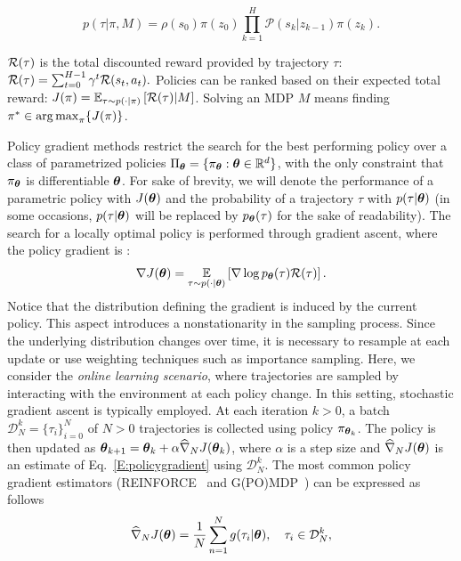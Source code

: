 \[
p(\tau|\pi,M) = \rho(s_0) \pi(z_0) \prod_{k=1}^{H} \mathcal{P}(s_k|z_{k-1})\pi(z_k).
\]

$\Reward(\tau)$ is the total discounted reward provided by trajectory $\tau$:
%
$\Reward(\tau) = \sum_{t=0}^{H-1}\gamma^t\Reward(s_t,a_t).$
%
Policies can be ranked based on their expected total reward: $J(\pi) = \EVV[\tau \sim p(\cdot|\pi)]{\Reward(\tau)|M}$.
Solving an \acs{MDP} $M$ means finding $\pi^* \in \argmax_{\pi} \{J(\pi)\}$.

Policy gradient methods restrict the search for the best performing policy over a class of parametrized policies $\Pi_{\vtheta}=\{\pol: \vtheta \in \realspace^d\}$, with the only constraint that $\pol$ is differentiable \wrt $\vtheta$. For sake of brevity, we will denote the performance of a parametric policy with $J(\vtheta)$ and the probability of a trajectory $\tau$ with $p(\tau|\vtheta)$ (in some occasions, $p(\tau|\vtheta)$ will be replaced by $p_{\vtheta}(\tau)$ for the sake of readability).
The search for a locally optimal policy is performed through gradient ascent, where the policy gradient
is \citep{sutton2000policy, Peters2008reinf}:
\begin{align} \label{E:policygradient}
	\gradJ{\vtheta} = \EVV[\tau \sim p(\cdot|\vtheta)]{\score{\vtheta}{\tau}\Reward(\tau)}.
\end{align}
Notice that the distribution defining the gradient is induced by the current policy. This aspect introduces a nonstationarity in the sampling process. Since the underlying distribution changes over time, it is necessary to resample at each update or use weighting techniques such as importance sampling.
Here, we consider the \emph{online learning scenario}, where trajectories are sampled by interacting with the environment at each policy change. 
In this setting, stochastic gradient ascent is typically employed.
At each iteration $k >0$, a batch $\mathcal{D}_N^k = \{\tau_i\}_{i=0}^N$ of $N>0$ trajectories is collected using policy $\pi_{\vtheta_k}$.
The policy is then updated as $\vtheta_{k+1}  = \vtheta_k + \alpha\gradApp{\vtheta_k}{N}$, where $\alpha$ is a step size and $\gradApp{\vtheta}{N}$ is an estimate of Eq.~\eqref{E:policygradient} using $\mathcal{D}_N^k$. The most common policy gradient estimators (\eg REINFORCE~\citep{williams1992simple} and G(PO)MDP~\citep{baxter2001infinite}) can be expressed as follows
\begin{align} \label{E:policygradient.estimate}
	\gradApp{\vtheta}{N} = \frac{1}{N}\sum_{n=1}^{N} g(\tau_i|\vtheta), \quad \tau_i \in \mathcal{D}_N^k,
\end{align}
